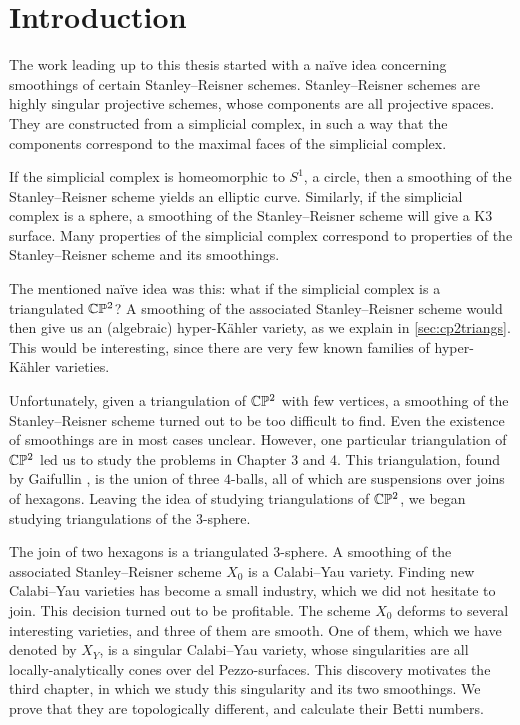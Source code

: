 \chapter{Introduction}
\label{sec:intro}

The work leading up to this thesis started with a naïve idea concerning smoothings of certain Stanley--Reisner schemes. Stanley--Reisner schemes are highly singular projective schemes, whose components are all projective spaces. They are constructed from a simplicial complex, in such a way that the components correspond to the maximal faces of the simplicial complex. 

If the simplicial complex is homeomorphic to $S^1$, a circle, then a smoothing of the Stanley--Reisner scheme yields an elliptic curve. Similarly, if the simplicial complex is a sphere, a smoothing of the Stanley--Reisner scheme will give a K3 surface. Many properties of the simplicial complex correspond to properties of the Stanley--Reisner scheme and its smoothings. 

The mentioned naïve idea was this: what if the simplicial complex is a triangulated $\mathbb{C} \mathbb{P}^2$? A smoothing of the associated Stanley--Reisner scheme would then give us an (algebraic) hyper-Kähler variety, as we explain in \cref{sec:cp2triangs}. This would be interesting, since there are very few known families of hyper-Kähler varieties.

Unfortunately, given a triangulation of $\mathbb{C} \mathbb{P}^2$ with few vertices, a smoothing of the Stanley--Reisner scheme turned out to be too difficult to find. Even the existence of smoothings are in most cases unclear. However, one particular triangulation of $\mathbb{C} \mathbb{P}^2$ led us to study the problems in Chapter 3 and 4. This triangulation, found by Gaifullin \cite{cp2_15_chess}, is the union of three $4$-balls, all of which are suspensions over joins of hexagons. Leaving the idea of studying triangulations of $\mathbb{C} \mathbb{P}^2$, we began studying 
triangulations of the $3$-sphere.

The join of two hexagons is a triangulated $3$-sphere. A smoothing of the associated Stanley--Reisner scheme $X_0$ is a Calabi--Yau variety. Finding new Calabi--Yau varieties has become a small industry, which we did not hesitate to join. This decision turned out to be profitable. The scheme $X_0$ deforms to several interesting varieties, and three of them are smooth. One of them, which we have denoted by $X_Y$, is a singular Calabi--Yau variety, whose singularities are all locally-analytically cones over del Pezzo-surfaces. This discovery motivates the third chapter, in which we study this singularity and its two smoothings. We prove that they are topologically different, and calculate their Betti numbers.

